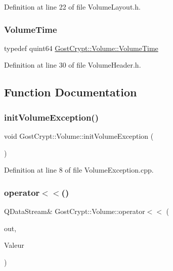 Definition at line 22 of file Volume\+Layout.\+h.

\mbox{\label{namespace_gost_crypt_1_1_volume_a4aab8aad1263f3abd1e4949b1e428468}} 
\subsubsection{\texorpdfstring{Volume\+Time}{VolumeTime}}
{\footnotesize\ttfamily typedef quint64 \hyperlink{namespace_gost_crypt_1_1_volume_a4aab8aad1263f3abd1e4949b1e428468}{Gost\+Crypt\+::\+Volume\+::\+Volume\+Time}}



Definition at line 30 of file Volume\+Header.\+h.



\subsection{Function Documentation}
\mbox{\label{namespace_gost_crypt_1_1_volume_a3023752494e086cccb82f5074d7c6e4c}} 
\subsubsection{\texorpdfstring{init\+Volume\+Exception()}{initVolumeException()}}
{\footnotesize\ttfamily void Gost\+Crypt\+::\+Volume\+::init\+Volume\+Exception (\begin{DoxyParamCaption}{ }\end{DoxyParamCaption})}



Definition at line 8 of file Volume\+Exception.\+cpp.

\mbox{\label{namespace_gost_crypt_1_1_volume_a0b2581ec3bb246b3da07a5a7cc4a04ad}} 
\subsubsection{\texorpdfstring{operator$<$$<$()}{operator<<()}\hspace{0.1cm}{\footnotesize\ttfamily [1/19]}}
{\footnotesize\ttfamily Q\+Data\+Stream\& Gost\+Crypt\+::\+Volume\+::operator$<$$<$ (\begin{DoxyParamCaption}\item[{Q\+Data\+Stream \&}]{out,  }\item[{const \hyperlink{struct_gost_crypt_1_1_volume_1_1_volume_information}{Volume\+Information} \&}]{Valeur }\end{DoxyParamCaption})}



